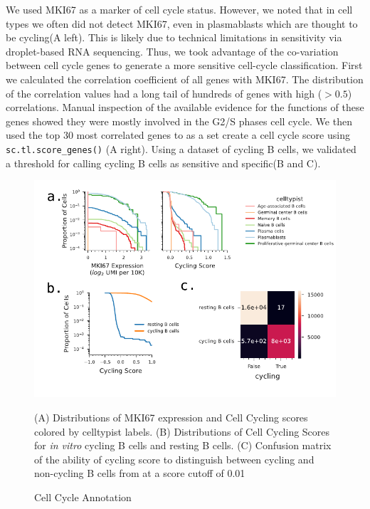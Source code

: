 We used MKI67 as a marker of cell cycle status. However, we noted that in cell types we often did not detect MKI67, even in plasmablasts which are thought to be cycling(A left). This is likely due to technical limitations in sensitivity via droplet-based RNA sequencing. Thus, we took advantage of the co-variation between cell cycle genes to generate a more sensitive cell-cycle classification. First we calculated the correlation coefficient of all genes with MKI67. The distribution of the correlation values had a long tail of hundreds of genes with high ($> 0.5$) correlations. Manual inspection of the available evidence for the functions of these genes showed they were mostly involved in the G2/S phases cell cycle. We then used the top 30 most correlated genes to as a set create a cell cycle score using \verb|sc.tl.score_genes()| (A right). Using a dataset of cycling B cells\cite{swift2023lineage}, we validated a threshold for calling cycling B cells as sensitive and specific(B and C).  
\begin{figure}[h!]
    \centering
    \includegraphics[width=\textwidth]{figs/Tabula_Bursa/SI/CellCycleSI.pdf}
    \caption{Cell Cycle Annotation}{(A) Distributions of MKI67 expression and Cell Cycling scores colored by celltypist labels. (B) Distributions of Cell Cycling Scores for \textit{in vitro} cycling B cells and resting B cells. (C) Confusion matrix of the ability of cycling score to distinguish between cycling and non-cycling B cells from \cite{swift2023lineage} at a score cutoff of 0.01}
    \label{fig:cell-cycle}
\end{figure}

